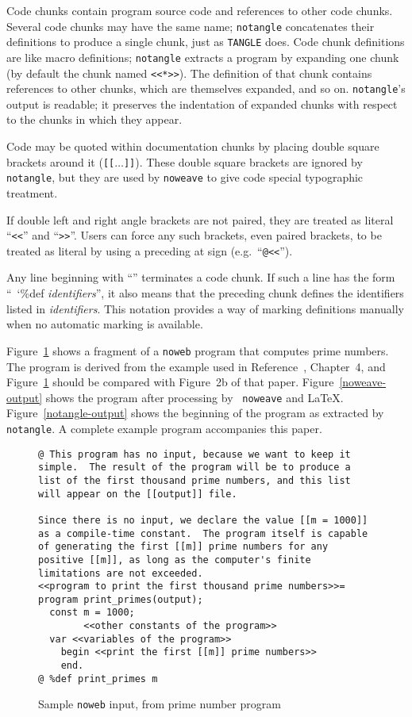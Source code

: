 Code chunks contain program source code and references to other code
chunks.  
Several code chunks may have the same name; {\tt notangle}
concatenates their definitions to produce a single chunk, just as
 {\tt TANGLE} does.
Code chunk definitions are like macro definitions;
{\tt notangle} extracts a program by expanding one chunk (by default
the chunk named \verb+<<*>>+).
The definition of that chunk contains references to other chunks,
which are themselves expanded, and so on.
{\tt notangle}'s output is readable; it preserves the indentation of expanded
chunks with respect to the chunks in which they appear.

Code may be quoted within documentation chunks by placing double
square brackets around it ({\tt [[}$\ldots${\tt]]}). 
These double square brackets are ignored by {\tt notangle}, but they
are used by {\tt noweave} to give code special typographic
treatment.

If double left and right angle brackets are not paired, they are
treated as literal ``{\tt<<}'' and ``{\tt>>}''.  Users can force any
such brackets, even paired brackets, to be treated as literal by
using a preceding at sign (e.g.~``{\tt @<<}'').

Any line beginning with ``{\tt@ }'' terminates a code chunk.
If such a line has the form
``{\tt@~\char`\%def {\rm\it identifiers}}'',
it also means that the preceding chunk defines the identifiers listed 
in {\it identifiers}.
This notation provides a way of marking definitions manually when 
no automatic marking is available.

Figure~\ref{sample-input} shows a fragment of a {\tt noweb} program
that computes prime numbers.
The program is derived from the example used in
Reference~, Chapter~4, and Figure~\ref{sample-input} should
be compared with Figure~2b of that paper.
Figure~\ref{noweave-output} shows the program after processing by {\tt
noweave} and {\LaTeX}.
Figure~\ref{notangle-output} shows the beginning of the program as
extracted by {\tt notangle}.
A complete example program accompanies this paper.

\begin{figure}[p]
\begin{verbatim}
@ This program has no input, because we want to keep it
simple.  The result of the program will be to produce a
list of the first thousand prime numbers, and this list
will appear on the [[output]] file.

Since there is no input, we declare the value [[m = 1000]]
as a compile-time constant.  The program itself is capable
of generating the first [[m]] prime numbers for any
positive [[m]], as long as the computer's finite
limitations are not exceeded.
<<program to print the first thousand prime numbers>>=
program print_primes(output);
  const m = 1000;
        <<other constants of the program>>
  var <<variables of the program>>
    begin <<print the first [[m]] prime numbers>>
    end.
@ %def print_primes m
\end{verbatim} 
\caption{Sample {\tt noweb} input, from prime number program}
\label{sample-input}
\end{figure}



